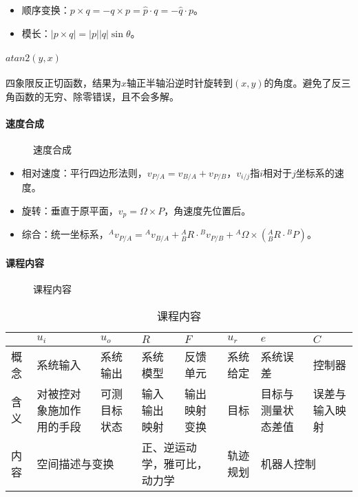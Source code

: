 \documentclass[
12pt, %
a4paper, 
oneside, %
headinclude,footinclude, %
]{scrartcl}
\begin{document}
\begin{itemize}
\item 顺序变换：$ p \times q = -q \times p = \hat{p} \cdot q = -\hat{q} \cdot p $。
\item 模长：$ |p \times q| = |p||q|\sin\theta $。
\end{itemize}
\paragraph{$ atan2(y, x) $}
四象限反正切函数，结果为$ x $轴正半轴沿逆时针旋转到$ (x, y) $的角度。避免了反三角函数的无穷、除零错误，且不会多解。
\paragraph{速度合成}
\begin{figure}[H]
\centering
{} \quad
{}
\caption{速度合成}
\end{figure}

\begin{itemize}
\item 相对速度：平行四边形法则，$ v_{P/A} = v_{B/A} + v_{P/B} $，$ v_{i/j} $指$ i $相对于$ j $坐标系的速度。
\item 旋转：垂直于原平面，$ v_p = \Omega \times P $，角速度先位置后。
\item 综合：统一坐标系，$ {}^A v_{P/A} = {}^A v_{B/A} + {}^A_B R \cdot {}^B v_{P/B} + {}^A \Omega \times ({}^A_B R \cdot {}^B P) $。
\end{itemize}
\paragraph{课程内容}
\begin{figure}[H]
\centering
{} \quad
{}
\caption{课程内容}
\end{figure}

\begin{table}[H]
\centering
\begin{tabular}{|p{0.9cm}|p{2cm}|p{2cm}|p{2cm}|p{2cm}|p{2cm}|p{2cm}|p{2cm}|}
\hline
& $ u_i $ & $ u_o $ & $ R $ & $ F $ & $ u_r $ & $ e $ & $ C $ \\
\hline
概念 & 系统输入 & 系统输出 & 系统模型 & 反馈单元 & 系统给定 & 系统误差 & 控制器 \\
\hline
含义 & 对被控对象施加作用的手段 & 可测目标状态 & 输入输出映射 & 输出映射变换 & 目标 & 目标与测量状态差值 & 误差与输入映射 \\
\hline
内容 & \multicolumn{2}{l|}{空间描述与变换} & \multicolumn{2}{p{4cm}|}{正、逆运动学，雅可比，动力学} & 轨迹规划 & \multicolumn{2}{l|}{机器人控制} \\
\hline
\end{tabular}
\caption{课程内容}
\end{table}
\end{document}
